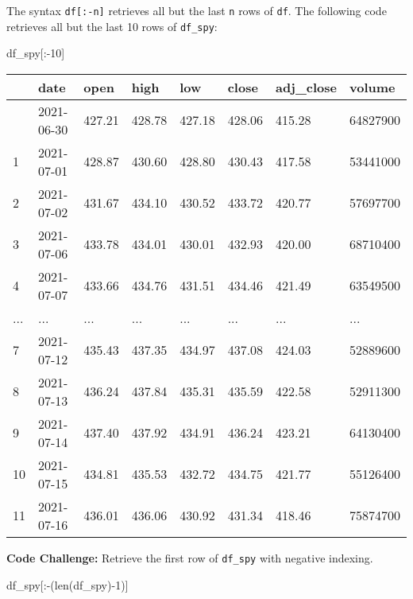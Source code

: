 \documentclass[
  letterpaper,
  DIV=11,
  numbers=noendperiod]{scrreprt}
\newenvironment{Shaded}{\begin{snugshade}}{\end{snugshade}}
\newcommand{\BuiltInTok}[1]{\textcolor[rgb]{0.00,0.23,0.31}{#1}}
\newcommand{\DecValTok}[1]{\textcolor[rgb]{0.68,0.00,0.00}{#1}}
\newcommand{\NormalTok}[1]{\textcolor[rgb]{0.00,0.23,0.31}{#1}}
\newcommand{\OperatorTok}[1]{\textcolor[rgb]{0.37,0.37,0.37}{#1}}
\begin{document}
The syntax \texttt{df{[}:-n{]}} retrieves all but the last \texttt{n}
rows of \texttt{df}. The following code retrieves all but the last 10
rows of \texttt{df\_spy}:

\begin{Shaded}
\begin{Highlighting}[]
\NormalTok{df\_spy[:}\OperatorTok{{-}}\DecValTok{10}\NormalTok{]}
\end{Highlighting}
\end{Shaded}

\begin{longtable}[]{@{}llllllll@{}}
\toprule\noalign{}
& date & open & high & low & close & adj\_close & volume \\
\midrule\noalign{}
\endhead
\bottomrule\noalign{}
\endlastfoot
0 & 2021-06-30 & 427.21 & 428.78 & 427.18 & 428.06 & 415.28 &
64827900 \\
1 & 2021-07-01 & 428.87 & 430.60 & 428.80 & 430.43 & 417.58 &
53441000 \\
2 & 2021-07-02 & 431.67 & 434.10 & 430.52 & 433.72 & 420.77 &
57697700 \\
3 & 2021-07-06 & 433.78 & 434.01 & 430.01 & 432.93 & 420.00 &
68710400 \\
4 & 2021-07-07 & 433.66 & 434.76 & 431.51 & 434.46 & 421.49 &
63549500 \\
... & ... & ... & ... & ... & ... & ... & ... \\
7 & 2021-07-12 & 435.43 & 437.35 & 434.97 & 437.08 & 424.03 &
52889600 \\
8 & 2021-07-13 & 436.24 & 437.84 & 435.31 & 435.59 & 422.58 &
52911300 \\
9 & 2021-07-14 & 437.40 & 437.92 & 434.91 & 436.24 & 423.21 &
64130400 \\
10 & 2021-07-15 & 434.81 & 435.53 & 432.72 & 434.75 & 421.77 &
55126400 \\
11 & 2021-07-16 & 436.01 & 436.06 & 430.92 & 431.34 & 418.46 &
75874700 \\
\end{longtable}

\textbf{Code Challenge:} Retrieve the first row of \texttt{df\_spy} with
negative indexing.

\begin{Shaded}
\begin{Highlighting}[]
\NormalTok{df\_spy[:}\OperatorTok{{-}}\NormalTok{(}\BuiltInTok{len}\NormalTok{(df\_spy)}\OperatorTok{{-}}\DecValTok{1}\NormalTok{)]}
\end{Highlighting}
\end{Shaded}
\end{document}
